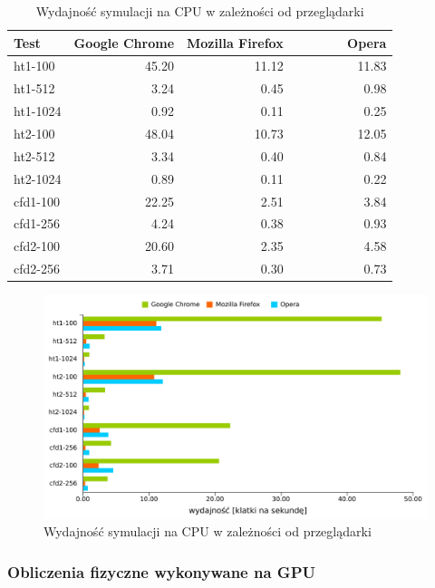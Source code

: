 \begin{table}[!h]
\caption{Wydajność symulacji na CPU w zależności od przeglądarki}
\centering
\begin{tabular}{|l|r|r|r|}
\hline
Test & Google Chrome & Mozilla Firefox & ~~~~~~~Opera \\ \hline
ht1-100 & 45.20 & 11.12 & 11.83 \\ \hline
ht1-512 & 3.24 & 0.45 & 0.98 \\ \hline
ht1-1024 & 0.92 & 0.11 & 0.25 \\ \hline
ht2-100 & 48.04 & 10.73 & 12.05 \\ \hline
ht2-512 & 3.34 & 0.40 & 0.84 \\ \hline
ht2-1024 & 0.89 & 0.11 & 0.22 \\ \hline
\hline
cfd1-100 & 22.25 & 2.51 & 3.84 \\ \hline
cfd1-256 & 4.24 & 0.38 & 0.93 \\ \hline
cfd2-100 & 20.60 & 2.35 & 4.58 \\ \hline
cfd2-256 & 3.71 & 0.30 & 0.73 \\ \hline
\end{tabular}
\label{tab:przegladarki}
\end{table}

\begin{figure}[!h]
\centering
\includegraphics[width=\textwidth]{img/browserPerf}
\caption{Wydajność symulacji na CPU w zależności od przeglądarki}
\label{fig:browserPerf}
\end{figure}

\clearpage

\subsubsection{Obliczenia fizyczne wykonywane na GPU}

